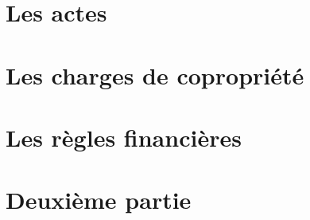 \documentclass[10pt,a4paper,twoside]{book}
\begin{document}
		
		
		
		
	\part{Les actes}
		
		
		
		
	\part{Les charges de copropriété}
		
		
		
		
	\part{Les règles financières}
		
		
		
		
		
	
	\part{Deuxième partie}
		
		
	
	\appendix
	
	\backmatter
	
	\tableofcontents
	
	\printindex
	
\end{document}
